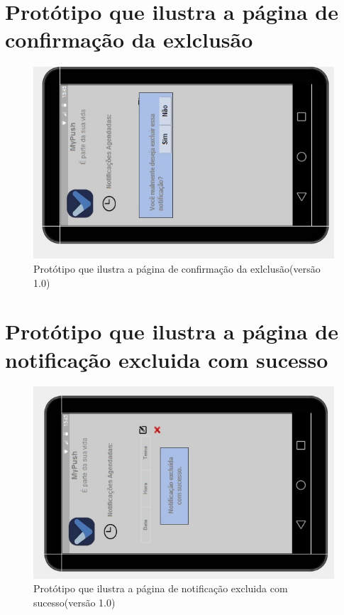 \begin{apendicesenv}
      \section*{Protótipo que ilustra a página de confirmação da exlclusão}

    \begin{figure}[!htbp]
      \centering
      \includegraphics[scale=0.5, angle=-90]{editaveis/figuras/prototipo_alta_fidelidade_v1/1_11}
      \caption{Protótipo que ilustra a página de confirmação da exlclusão(versão 1.0)}
      \label{v1}
    \end{figure}
    
      \section*{Protótipo que ilustra a página de notificação excluida com sucesso}

    \begin{figure}[!htbp]
      \centering
      \includegraphics[scale=0.5, angle=-90]{editaveis/figuras/prototipo_alta_fidelidade_v1/1_12}
      \caption{Protótipo que ilustra a página de notificação excluida com sucesso(versão 1.0)}
      \label{v1}
    \end{figure}
    

\end{apendicesenv}
